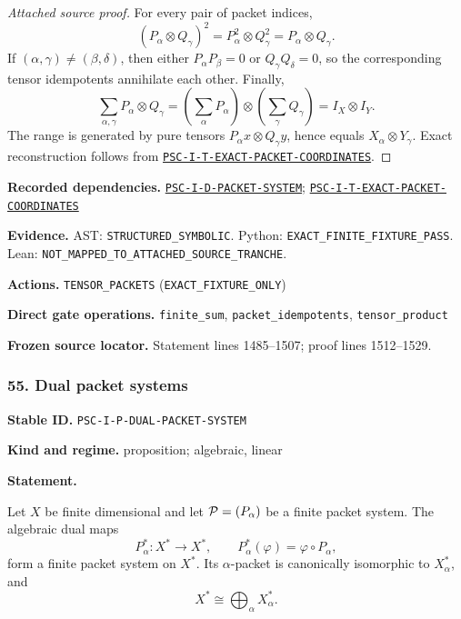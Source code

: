 \documentclass[a4paper,11pt]{article}
\newcommand{\field}[2]{\noindent\textbf{#1.} #2\par}
\begin{document}
\begin{proof}[Attached source proof]
For every pair of packet indices,
\[
(P_\alpha\otimes Q_\gamma)^2
=P_\alpha^2\otimes Q_\gamma^2
=P_\alpha\otimes Q_\gamma.
\]
If \((\alpha,\gamma)\neq(\beta,\delta)\), then either \(P_\alpha P_\beta=0\) or \(Q_\gamma Q_\delta=0\), so the corresponding tensor idempotents annihilate each other.  Finally,
\[
\sum_{\alpha,\gamma}P_\alpha\otimes Q_\gamma
=
\left(\sum_\alpha P_\alpha\right)
\otimes
\left(\sum_\gamma Q_\gamma\right)
=I_X\otimes I_Y.
\]
The range is generated by pure tensors \(P_\alpha x\otimes Q_\gamma y\), hence equals \(X_\alpha\otimes Y_\gamma\).  Exact reconstruction follows from \hyperref[rec:PSC-I-T-EXACT-PACKET-COORDINATES]{\nolinkurl{PSC-I-T-EXACT-PACKET-COORDINATES}}.
\end{proof}
\field{Recorded dependencies}{\hyperref[rec:PSC-I-D-PACKET-SYSTEM]{\nolinkurl{PSC-I-D-PACKET-SYSTEM}}; \hyperref[rec:PSC-I-T-EXACT-PACKET-COORDINATES]{\nolinkurl{PSC-I-T-EXACT-PACKET-COORDINATES}}}
\field{Evidence}{AST: \nolinkurl{STRUCTURED_SYMBOLIC}. Python: \nolinkurl{EXACT_FINITE_FIXTURE_PASS}. Lean: \nolinkurl{NOT_MAPPED_TO_ATTACHED_SOURCE_TRANCHE}.}
\field{Actions}{\nolinkurl{TENSOR_PACKETS} (\nolinkurl{EXACT_FIXTURE_ONLY})}
\field{Direct gate operations}{\nolinkurl{finite_sum}, \nolinkurl{packet_idempotents}, \nolinkurl{tensor_product}}
\field{Frozen source locator}{Statement lines 1485--1507; proof lines 1512--1529.}
\subsubsection*{55. Dual packet systems}
\label{rec:PSC-I-P-DUAL-PACKET-SYSTEM}
\field{Stable ID}{\nolinkurl{PSC-I-P-DUAL-PACKET-SYSTEM}}
\field{Kind and regime}{proposition; algebraic, linear}
\textbf{Statement.}\par
Let \(X\) be finite dimensional and let \(\mathcal P=(P_\alpha)\) be a finite packet system.  The algebraic dual maps
\[
P_\alpha^*:X^*\to X^*,
\qquad
P_\alpha^*(\varphi)=\varphi\circ P_\alpha,
\]
form a finite packet system on \(X^*\).  Its \(\alpha\)-packet is canonically isomorphic to \(X_\alpha^*\), and
\[
X^*\cong\bigoplus_\alpha X_\alpha^*.
\]
\end{document}
